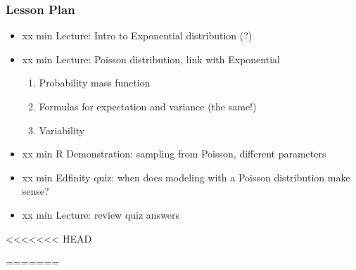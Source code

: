 \begin{frame}
    \frametitle{Lesson Plan}
    \begin{itemize}
        \item xx min Lecture: Intro to Exponential distribution (?)
        \item xx min Lecture: Poisson distribution, link with Exponential
        \begin{enumerate}
            \item Probability mass function
            \item Formulas for expectation and variance (the same!)
            \item Variability
        \end{enumerate}
        \item xx min R Demonstration: sampling from Poisson, different parameters
        \item xx min Edfinity quiz: when does modeling with a Poisson distribution make sense?
        \item xx min Lecture: review quiz answers
    \end{itemize}
<<<<<<< HEAD
\end{frame}
    
\begin{frame}
=======
    \end{frame}
    
